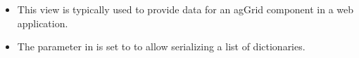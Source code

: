 \documentclass[letterpaper,10pt,english]{sphinxmanual}
\begin{document}
\begin{fulllineitems}
\begin{description}
\begin{itemize}
\item {} 
\sphinxAtStartPar
This view is typically used to provide data for an ag\sphinxhyphen{}Grid component in a web application.

\item {} 
\sphinxAtStartPar
The  parameter in  is set to  to allow serializing a list of dictionaries.

\end{itemize}

\end{description}

\end{fulllineitems}

\end{document}
